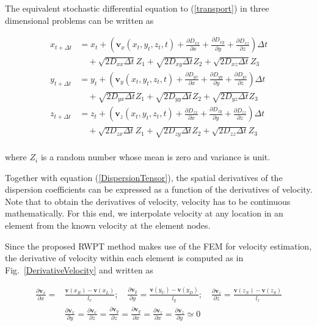 The equivalent stochastic differential equation to (\ref{transport}) in three dimensional problems can be written as \cite{aT90,eL96,wK88}

\begin{equation}\label{ModifiedStochasticDifferentialEquation}
\begin{array}{llllll}
x _{t+\Delta t} & =x _{t}+ \left(\mathbf{v}_x(x _t,y _t,z _t,t) + \frac{\partial D _{xx}}{\partial x} + \frac{\partial D _{xy}}{\partial y} + \frac{\partial D _{xz}}{\partial z} \right ) \Delta t \\
&\quad + \sqrt{2D _{xx} \Delta t }Z _1 + \sqrt{2D _{xy} \Delta t }Z _2 + \sqrt{2D _{xz} \Delta t }Z _3 \\
y _{t+\Delta t} & =y _{t}+ \left(\mathbf{v}_y(x _t,y _t,z _t,t) + \frac{\partial D _{yx}}{\partial x} + \frac{\partial D _{yy}}{\partial y} + \frac{\partial D _{yz}}{\partial z} \right ) \Delta t \\
&\quad + \sqrt{2D _{yx} \Delta t }Z _1 + \sqrt{2D _{yy} \Delta t }Z _2 + \sqrt{2D _{yz} \Delta t }Z _3 \\
z _{t+\Delta t} & =z _{t}+ \left(\mathbf{v}_z(x _t,y _t,z _t,t) + \frac{\partial D _{zx}}{\partial x} + \frac{\partial D _{zy}}{\partial y} + \frac{\partial D _{zz}}{\partial z} \right ) \Delta t \\
&\quad + \sqrt{2D _{zx} \Delta t }Z _1 + \sqrt{2D _{zy} \Delta t }Z _2 + \sqrt{2D _{zz} \Delta t }Z _3 \\
\end{array}
\end{equation}

where $Z_{i}$ is a random number whose mean is zero and variance is unit.

Together with equation (\ref{DispersionTensor}), the spatial derivatives of the dispersion coefficients can be expressed as a function of the derivatives of velocity. Note that to obtain the derivatives of velocity, velocity has to be continuous mathematically. For this end, we interpolate velocity at any location in an element from the known velocity at the element nodes.


Since the proposed RWPT method makes use of the FEM for velocity estimation, the derivative of velocity within each element is computed as in Fig.~\ref{DerivativeVelocity} and written as

\begin{equation}\label{DerivativeVelocityNotZero}
\begin{array}{ll}
\frac {\partial \mathbf{v}_x}{\partial x} = & \frac {\mathbf{v}(x_R) - \mathbf{v}(x_L)}{l _x}; \quad
\frac {\partial \mathbf{v}_y}{\partial y} = \frac {\mathbf{v}(y _U) - \mathbf{v}(y _D)}{l _y}; \quad
\frac {\partial \mathbf{v}_z}{\partial z} = \frac {\mathbf{v}(z _N) - \mathbf{v}(z _S)}{l _z} \\
& \frac {\partial \mathbf{v}_x}{\partial y} = \frac {\partial \mathbf{v}_x}{\partial z} =
\frac {\partial \mathbf{v}_y}{\partial z} = \frac {\partial \mathbf{v}_y}{\partial x} =
\frac {\partial \mathbf{v}_z}{\partial x} = \frac {\partial \mathbf{v}_z}{\partial y}
\simeq 0
\end{array}
\end{equation}

